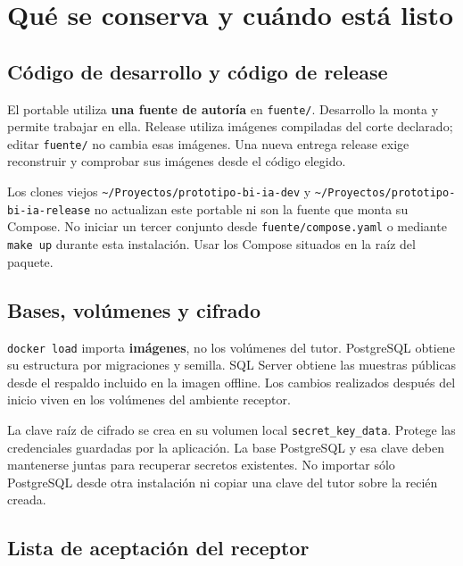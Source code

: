 \documentclass[
  spanish,
  10pt,
  a4paper,
]{article}
\begin{document}
\clearpage

\section{Qué se conserva y cuándo está
listo}\label{quuxe9-se-conserva-y-cuuxe1ndo-estuxe1-listo}

\subsection{Código de desarrollo y código de
release}\label{cuxf3digo-de-desarrollo-y-cuxf3digo-de-release}

El portable utiliza \textbf{una fuente de autoría} en \texttt{fuente/}.
Desarrollo la monta y permite trabajar en ella. Release utiliza imágenes
compiladas del corte declarado; editar \texttt{fuente/} no cambia esas
imágenes. Una nueva entrega release exige reconstruir y comprobar sus
imágenes desde el código elegido.

Los clones viejos
\texttt{\textasciitilde{}/Proyectos/prototipo-bi-ia-dev} y
\texttt{\textasciitilde{}/Proyectos/prototipo-bi-ia-release} no
actualizan este portable ni son la fuente que monta su Compose. No
iniciar un tercer conjunto desde \texttt{fuente/compose.yaml} o mediante
\texttt{make\ up} durante esta instalación. Usar los Compose situados en
la raíz del paquete.

\subsection{Bases, volúmenes y
cifrado}\label{bases-voluxfamenes-y-cifrado}

\texttt{docker\ load} importa \textbf{imágenes}, no los volúmenes del
tutor. PostgreSQL obtiene su estructura por migraciones y semilla. SQL
Server obtiene las muestras públicas desde el respaldo incluido en la
imagen offline. Los cambios realizados después del inicio viven en los
volúmenes del ambiente receptor.

La clave raíz de cifrado se crea en su volumen local
\texttt{secret\_key\_data}. Protege las credenciales guardadas por la
aplicación. La base PostgreSQL y esa clave deben mantenerse juntas para
recuperar secretos existentes. No importar sólo PostgreSQL desde otra
instalación ni copiar una clave del tutor sobre la recién creada.

\subsection{Lista de aceptación del
receptor}\label{lista-de-aceptaciuxf3n-del-receptor}
\end{document}
